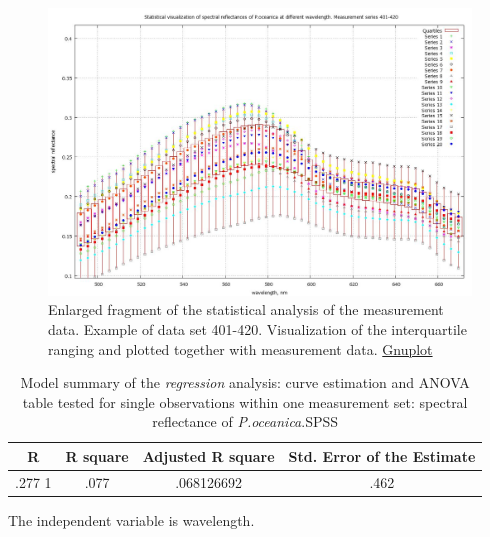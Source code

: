 \documentclass[11pt]{article}
\begin{document}
\begin{appendices}
\begin{figure}[H]
\begin{center}
		\label{fig:A.13}
	\end{center}
\end{figure}
\begin{figure}[H]
	\begin{center}
		\includegraphics[scale=0.25]{GNU-enlarged-M-401-420.jpg}
		\caption{Enlarged fragment of the statistical analysis of the measurement data. Example of data set 401-420. 
		Visualization of the interquartile ranging and plotted together with measurement data. \href{http://www.gnuplot.info/}{Gnuplot}}
		\label{fig:A.14}
	\end{center}
\end{figure}
\pagebreak

\begin{table}[htbp]
	\caption{Model summary of the \textit{regression} analysis: curve estimation and ANOVA table tested for single observations within one measurement set: spectral reflectance of \textit{P.oceanica}.\ac{SPSS}}
	\begin{center}
		\begin{tabular}{|c|c|c|c|}
			\hline\hline
			\textbf{R} & \textbf{R square} & \textbf{Adjusted R square} & \textbf{Std. Error of the Estimate} \\ \hline\hline
			.277 1 & .077 & .068126692 & .462 \\ \hline
		\end{tabular}
	\end{center}
	The independent variable is wavelength. 
	\label{tab:5}
\end{table}


\end{appendices}
\end{document}
